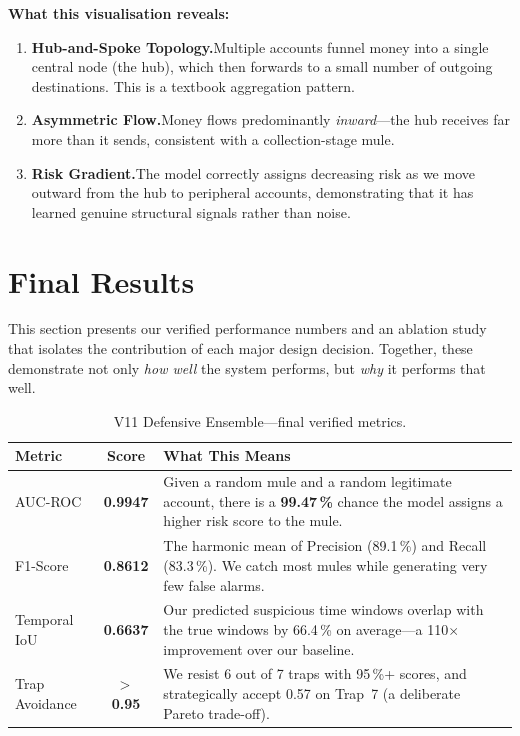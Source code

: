 \documentclass[11pt, a4paper]{article}
\begin{document}
\textbf{What this visualisation reveals:}

\begin{enumerate}[leftmargin=1.5em, itemsep=4pt]
    \item \textbf{Hub-and-Spoke Topology.}\quad Multiple accounts funnel money into a single
          central node (the hub), which then forwards to a small number of outgoing
          destinations. This is a textbook aggregation pattern.

    \item \textbf{Asymmetric Flow.}\quad Money flows predominantly \emph{inward}---the hub
          receives far more than it sends, consistent with a collection-stage mule.

    \item \textbf{Risk Gradient.}\quad The model correctly assigns decreasing risk as we
          move outward from the hub to peripheral accounts, demonstrating that it has learned
          genuine structural signals rather than noise.
\end{enumerate}


\section{Final Results}

This section presents our verified performance numbers and an ablation study that
isolates the contribution of each major design decision. Together, these demonstrate not
only \emph{how well} the system performs, but \emph{why} it performs that well.

\begin{table}[H]
\centering
\caption{V11 Defensive Ensemble---final verified metrics.}
\begin{tabular}{@{}lcp{6.5cm}@{}}
\toprule
\textbf{Metric} & \textbf{Score} & \textbf{What This Means} \\
\midrule
AUC-ROC &
    \textbf{0.9947} &
    Given a random mule and a random legitimate account, there is a \textbf{99.47\,\%}
    chance the model assigns a higher risk score to the mule. \\[6pt]
F1-Score &
    \textbf{0.8612} &
    The harmonic mean of Precision (89.1\,\%) and Recall (83.3\,\%). We catch most mules
    while generating very few false alarms. \\[6pt]
Temporal IoU &
    \textbf{0.6637} &
    Our predicted suspicious time windows overlap with the true windows by 66.4\,\% on
    average---a 110$\times$ improvement over our baseline. \\[6pt]
Trap Avoidance &
    $>$\,\textbf{0.95} &
    We resist 6 out of 7 traps with 95\,\%+ scores, and strategically accept 0.57 on
    Trap~7 (a deliberate Pareto trade-off). \\
\bottomrule
\end{tabular}
\end{table}
\end{document}

